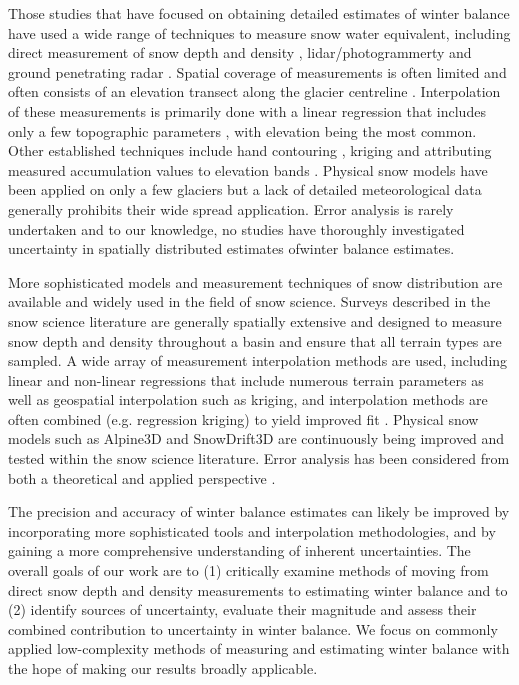 \documentclass[twocolumn, letterpaper]{igs}
\begin{document}
Those studies that have focused on obtaining detailed estimates of winter balance have used a wide range of techniques to measure snow water equivalent, including direct measurement of snow depth and density \citep[e.g.][]{Cullen2017}, lidar/photogrammerty \citep[e.g.][]{Sold2013} and ground penetrating radar \citep[e.g.][]{Machguth2006, Gusmeroli2014, McGrath2015}. Spatial coverage of measurements is often limited and often consists of an elevation transect along the glacier centreline \citep[e.g.][]{Kaser2003, Machguth2006}. Interpolation of these measurements is primarily done with a linear regression that includes only a few topographic parameters \citep[e.g.][]{MacDougall2011}, with elevation being the most common. Other established techniques include hand contouring \citep[e.g.][]{Tangborn1975}, kriging \citep[e.g.][]{Hock1999} and attributing measured accumulation values to elevation bands \citep[e.g.][]{Thibert2008}. Physical snow models have been applied on only a few glaciers \citep[e.g.][]{Mott2008, Dadic2010} but a lack of detailed meteorological data generally prohibits their wide spread application. Error analysis is rarely undertaken and to our knowledge, no studies have thoroughly investigated uncertainty in spatially distributed estimates ofwinter balance estimates. 

More sophisticated models and measurement techniques of snow distribution are available and widely used in the field of snow science. Surveys described in the snow science literature are generally spatially extensive and designed to measure snow depth and density throughout a basin and ensure that all terrain types are sampled. A wide array of measurement interpolation methods are used, including linear \citep[e.g.][]{Lopez2010} and non-linear regressions \citep[e.g.][]{Molotch2005} that include numerous terrain parameters as well as geospatial interpolation \citep[e.g.][]{Erxleben2002} such as kriging, and interpolation methods are often combined (e.g. regression kriging) to yield improved fit \citep[e.g.][]{Balk2000}. Physical snow models such as Alpine3D \citep{Lehning2006} and SnowDrift3D \citep{Schneiderbauer2011} are continuously being improved and tested within the snow science literature. Error analysis has been considered from both a theoretical \citep[e.g.][]{Trujillo2015} and applied perspective \citep[e.g.][]{Turcan1975,Woo1978, Deems2006}. 

The precision and accuracy of winter balance estimates can likely be improved by incorporating more sophisticated tools and interpolation methodologies, and by gaining a more comprehensive understanding of inherent uncertainties. The overall goals of our work are to (1) critically examine methods of moving from direct snow depth and density measurements to estimating winter balance and to (2) identify sources of uncertainty, evaluate their magnitude and assess their combined contribution to uncertainty in winter balance. We focus on commonly applied low-complexity methods of measuring and estimating winter balance with the hope of making our results broadly applicable.
\end{document}
